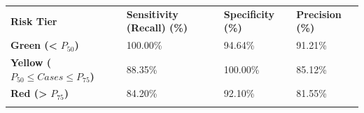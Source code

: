 \documentclass[
]{article}
\newcounter{none} %
\begin{document}
{\def\LTcaptype{none} %
\begin{longtable}[]{@{}
  >{\raggedright\arraybackslash}p{}
  >{\raggedright\arraybackslash}p{}
  >{\raggedright\arraybackslash}p{}
  >{\raggedright\arraybackslash}p{}@{}}
\toprule\noalign{}
\begin{minipage}[b]{\linewidth}\raggedright
\textbf{Risk Tier}
\end{minipage} & \begin{minipage}[b]{\linewidth}\raggedright
\textbf{Sensitivity (Recall) (\%)}
\end{minipage} & \begin{minipage}[b]{\linewidth}\raggedright
\textbf{Specificity (\%)}
\end{minipage} & \begin{minipage}[b]{\linewidth}\raggedright
\textbf{Precision (\%)}
\end{minipage} \\
\begin{minipage}[b]{\linewidth}\raggedright
\textbf{Green (\textless{}} \(P_{50}\)\textbf{)}
\end{minipage} & \begin{minipage}[b]{\linewidth}\raggedright
100.00\%
\end{minipage} & \begin{minipage}[b]{\linewidth}\raggedright
94.64\%
\end{minipage} & \begin{minipage}[b]{\linewidth}\raggedright
91.21\%
\end{minipage} \\
\begin{minipage}[b]{\linewidth}\raggedright
\textbf{Yellow (}\(P_{50} \leq Cases \leq P_{75}\)\textbf{)}
\end{minipage} & \begin{minipage}[b]{\linewidth}\raggedright
88.35\%
\end{minipage} & \begin{minipage}[b]{\linewidth}\raggedright
100.00\%
\end{minipage} & \begin{minipage}[b]{\linewidth}\raggedright
85.12\%
\end{minipage} \\
\begin{minipage}[b]{\linewidth}\raggedright
\textbf{Red (\textgreater{}} \(P_{75}\)\textbf{)}
\end{minipage} & \begin{minipage}[b]{\linewidth}\raggedright
84.20\%
\end{minipage} & \begin{minipage}[b]{\linewidth}\raggedright
92.10\%
\end{minipage} & \begin{minipage}[b]{\linewidth}\raggedright
81.55\%
\end{minipage} \\
\midrule\noalign{}
\endhead
\bottomrule\noalign{}
\endlastfoot
\end{longtable}
}
\end{document}
